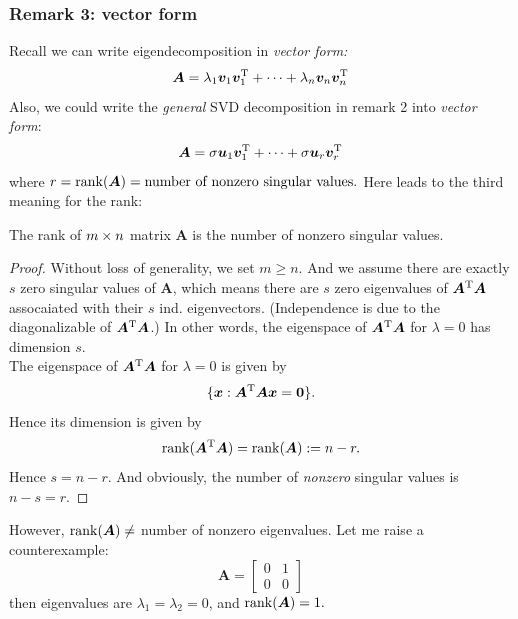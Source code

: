 \subsubsection{Remark 3: vector form}
Recall we can write eigendecomposition in \textit{vector form:}
\[
\bm A=\lambda_1\bm v_1\bm v_1^{\mathrm T}+\dots+\lambda_n\bm v_n\bm v_n^{\mathrm T}
\]
Also, we could write the \emph{general} SVD decomposition in remark 2 into \textit{vector form}:
\[
\bm A=\sigma\bm u_1\bm v_1^{\mathrm T}+\dots+\sigma\bm u_r\bm v_r^{\mathrm T}
\]
where $r=\operatorname{rank}(\bm A)=\text{number of nonzero singular values.}$ Here leads to the third meaning for the rank:
\begin{proposition}
The rank of $m\times n$ matrix $\bm A$ is the number of nonzero singular values.
\end{proposition}
\begin{proof}
Without loss of generality, we set $m\ge n$. And we assume there are exactly $s$ zero singular values of $\bm A$, which means there are $s$ zero eigenvalues of $\bm A^{\mathrm T}\bm A$ assocaiated with their $s$ ind. eigenvectors. (Independence is due to the diagonalizable of $\bm A^{\mathrm T}\bm A$.) In other words, the eigenspace of $\bm A^{\mathrm T}\bm A$ for $\lambda=0$ has dimension $s$.\\
The eigenspace of $\bm A^{\mathrm T}\bm A$ for $\lambda=0$ is given by
\[
\{\bm x:\bm A^{\mathrm T}\bm A\bm x=\bm 0\}.
\]
Hence its dimension is given by
\[
\operatorname{rank}(\bm A^{\mathrm T}\bm A)=\operatorname{rank}(\bm A):=n-r.
\]
Hence $s=n-r$. And obviously, the number of \emph{nonzero} singular values is $n-s=r$.
\end{proof}
\begin{remark}
However, $\operatorname{rank}(\bm A)\ne$ number of nonzero eigenvalues. Let me raise a counterexample:
\[
\bm A=\begin{bmatrix}
0&1\\0&0
\end{bmatrix}
\]
then eigenvalues are $\lambda_1=\lambda_2=0$, and $\operatorname{rank}(\bm A)=1.$
\end{remark}
